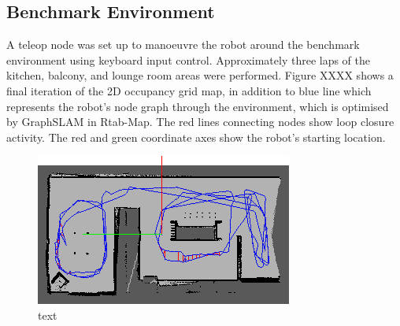 \documentclass[a4paper]{article}
\begin{document}
\subsection{Benchmark Environment}
A teleop node was set up to manoeuvre the robot around the benchmark environment using keyboard input control. Approximately three laps of the kitchen, balcony, and lounge room areas were performed. Figure XXXX shows a final iteration of the 2D occupancy grid map, in addition to blue line which represents the robot's node graph through the environment, which is optimised by GraphSLAM in Rtab-Map. The red lines connecting nodes show loop closure activity. The red and green coordinate axes show the robot's starting location.
\begin{figure}[h]
\centering
\includegraphics[scale=0.8]{kitchen_graph_view}
\caption{text}
\end{figure}
\end{document}
